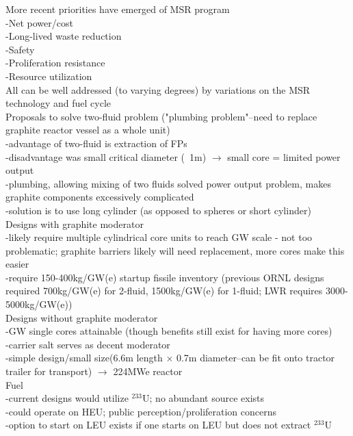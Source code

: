 \documentclass{report}
\newcommand{\tab}{\-\hspace{1cm}}
\begin{document}
More recent priorities have emerged of MSR program\\
-Net power/cost\\
-Long-lived waste reduction\\
-Safety\\
-Proliferation resistance\\
-Resource utilization\\
All can be well addressed (to varying degrees) by variations on the MSR technology and fuel cycle\\

Proposals to solve two-fluid problem ("plumbing problem"--need to replace graphite reactor vessel as a whole unit)\\
-advantage of two-fluid is extraction of FPs\\
-disadvantage was small critical diameter (~1m) $\rightarrow$ small core = limited power output\\
-plumbing, allowing mixing of two fluids solved power output problem, makes graphite components excessively complicated\\
-solution is to use long cylinder (as opposed to spheres or short cylinder)\\

Designs with graphite moderator\\
-likely require multiple cylindrical core units to reach GW scale
\tab - not too problematic; graphite barriers likely will need replacement, more cores make this easier\\
-require 150-400kg/GW(e) startup fissile inventory (previous ORNL designs required 700kg/GW(e) for 2-fluid, 1500kg/GW(e) for 1-fluid; LWR requires 3000-5000kg/GW(e))\\

Designs without graphite moderator\\
-GW single cores attainable (though benefits still exist for having more cores)\\
-carrier salt serves as decent moderator\\
-simple design/small size(6.6m length $\times$ 0.7m diameter--can be fit onto tractor trailer for transport) $\rightarrow$ 224MWe reactor\\

Fuel\\
-current designs would utilize $^{233}\text{U}$; no abundant source exists\\
-could operate on HEU; public perception/proliferation concerns\\
-option to start on LEU exists if one starts on LEU but does not extract $^{233}\text{U}$\\
\end{document}
